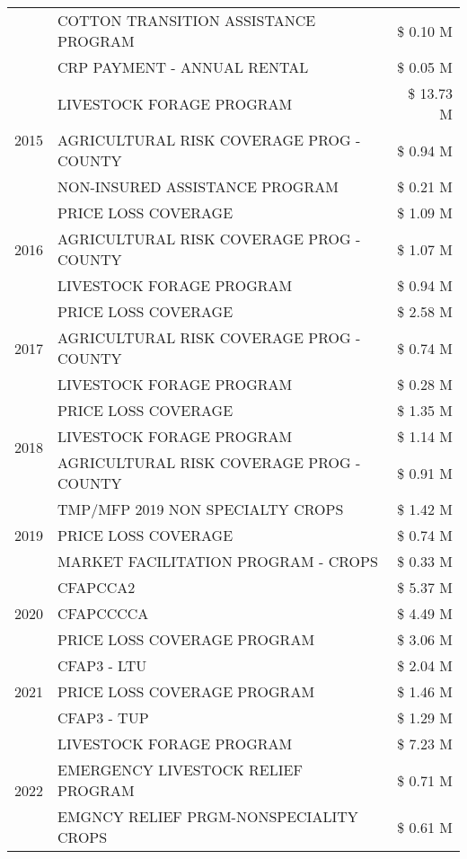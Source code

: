 \begin{tabular}{llr}
 & COTTON TRANSITION ASSISTANCE PROGRAM & \$ 0.10 M \\
 & CRP PAYMENT - ANNUAL RENTAL & \$ 0.05 M \\
\cline{1-3}
\multirow[t]{3}{*}{2015} & LIVESTOCK FORAGE PROGRAM & \$ 13.73 M \\
 & AGRICULTURAL RISK COVERAGE PROG - COUNTY & \$ 0.94 M \\
 & NON-INSURED ASSISTANCE PROGRAM & \$ 0.21 M \\
\cline{1-3}
\multirow[t]{3}{*}{2016} & PRICE LOSS COVERAGE & \$ 1.09 M \\
 & AGRICULTURAL RISK COVERAGE PROG - COUNTY & \$ 1.07 M \\
 & LIVESTOCK FORAGE PROGRAM & \$ 0.94 M \\
\cline{1-3}
\multirow[t]{3}{*}{2017} & PRICE LOSS COVERAGE & \$ 2.58 M \\
 & AGRICULTURAL RISK COVERAGE PROG - COUNTY & \$ 0.74 M \\
 & LIVESTOCK FORAGE PROGRAM & \$ 0.28 M \\
\cline{1-3}
\multirow[t]{3}{*}{2018} & PRICE LOSS COVERAGE & \$ 1.35 M \\
 & LIVESTOCK FORAGE PROGRAM & \$ 1.14 M \\
 & AGRICULTURAL RISK COVERAGE PROG - COUNTY & \$ 0.91 M \\
\cline{1-3}
\multirow[t]{3}{*}{2019} & TMP/MFP 2019 NON SPECIALTY CROPS & \$ 1.42 M \\
 & PRICE LOSS COVERAGE & \$ 0.74 M \\
 & MARKET FACILITATION PROGRAM - CROPS & \$ 0.33 M \\
\cline{1-3}
\multirow[t]{3}{*}{2020} & CFAPCCA2 & \$ 5.37 M \\
 & CFAPCCCCA & \$ 4.49 M \\
 & PRICE LOSS COVERAGE PROGRAM & \$ 3.06 M \\
\cline{1-3}
\multirow[t]{3}{*}{2021} & CFAP3 - LTU & \$ 2.04 M \\
 & PRICE LOSS COVERAGE PROGRAM & \$ 1.46 M \\
 & CFAP3 - TUP & \$ 1.29 M \\
\cline{1-3}
\multirow[t]{3}{*}{2022} & LIVESTOCK FORAGE PROGRAM & \$ 7.23 M \\
 & EMERGENCY LIVESTOCK RELIEF PROGRAM & \$ 0.71 M \\
 & EMGNCY RELIEF PRGM-NONSPECIALITY CROPS & \$ 0.61 M \\
\cline{1-3}
\bottomrule
\end{tabular}

